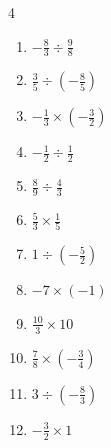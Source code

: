 \begin{multicols}{4}
\begin{enumerate}
  \item $\displaystyle -\frac{8}{3}\div{}\frac{9}{8}$


  \item $\displaystyle \frac{3}{5}\div{}\left(-\frac{8}{5}\right)$


  \item $\displaystyle -\frac{1}{3}\times{}\left(-\frac{3}{2}\right)$


  \item $\displaystyle -\frac{1}{2}\div{}\frac{1}{2}$

        \phantom{$\displaystyle =-1$}

  \item $\displaystyle \frac{8}{9}\div{}\frac{4}{3}$


  \item $\displaystyle \frac{5}{3}\times{}\frac{1}{5}$


  \item $\displaystyle 1\div{}\left(-\frac{5}{2}\right)$


\columnbreak %

\resetques

  \item $\displaystyle -7\times{}\left(-1\right)$

        \phantom{$\displaystyle =7$}

  \item $\displaystyle \frac{10}{3}\times{}10$


  \item $\displaystyle \frac{7}{8}\times{}\left(-\frac{3}{4}\right)$


  \item $\displaystyle 3\div{}\left(-\frac{8}{3}\right)$


  \item $\displaystyle -\frac{3}{2}\times{}1$


\end{enumerate}
\end{multicols}
